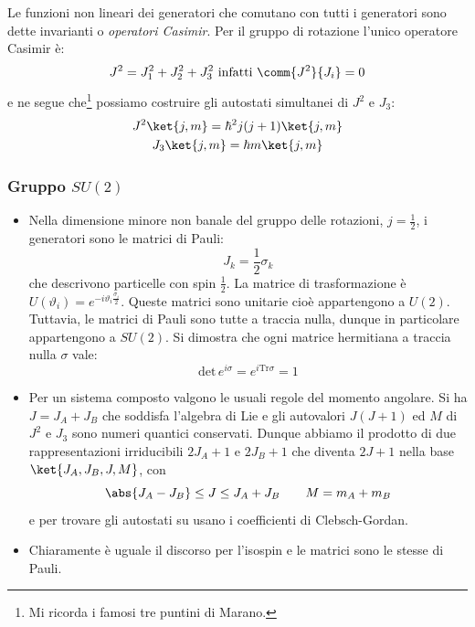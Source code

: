 \begin{itemize}
\begin{equation*}
    \end{equation*}
    Le funzioni non lineari dei generatori che comutano con tutti i generatori sono dette invarianti o \textit{operatori Casimir}. Per il gruppo di rotazione l'unico operatore Casimir è:
    \begin{equation*}
        J^2=J_1^2+J_2^2+J_3^2\text{ infatti }\comm{J^2}{J_i}=0
    \end{equation*}
    e ne segue che\footnote{Mi ricorda i famosi tre puntini di Marano.} possiamo costruire gli autostati simultanei di $J^2$ e $J_3$:
    \begin{gather*}
        J^2\ket{j,m}=\hbar^2j(j+1)\ket{j,m}\\
        J_3\ket{j,m}=\hbar m\ket{j,m}
    \end{gather*}
\end{itemize}
\subsubsection{Gruppo $SU(2)$}
\begin{itemize}
\item Nella dimensione minore non banale del gruppo delle rotazioni, $j=\frac12$, i generatori sono le matrici di Pauli:
\begin{equation*}
    J_k=\frac12\sigma_k
\end{equation*}
che descrivono particelle con spin $\frac12$.
La matrice di trasformazione è $U(\vartheta_i)=e^{-i\vartheta_i\frac{\sigma_i}2}$. Queste matrici sono unitarie cioè appartengono a $U(2)$. Tuttavia, le matrici di Pauli sono tutte a traccia nulla, dunque in particolare appartengono a $SU(2)$. Si dimostra che ogni matrice hermitiana a traccia nulla $\sigma$ vale:
\begin{equation*}
    \text{det}\,e^{i\sigma}=e^{i\text{Tr}\sigma}=1
\end{equation*}
\item Per un sistema composto valgono le usuali regole del momento angolare. Si ha $J=J_A+J_B$ che soddisfa l'algebra di Lie e gli autovalori $J(J+1)$ ed $M$ di $J^2$ e $J_3$ sono numeri quantici conservati. Dunque abbiamo il prodotto di due rappresentazioni irriducibili $2J_A+1$ e $2J_B+1$ che diventa $2J+1$ nella base $\ket{J_A,J_B,J,M}$, con 
\begin{equation*}
    \abs{J_A-J_B}\leq J\leq J_A+J_B\qquad M=m_A+m_B
\end{equation*}
e per trovare gli autostati su usano i coefficienti di Clebsch-Gordan.
\item Chiaramente è uguale il discorso per l'isospin e le matrici sono le stesse di Pauli. 
\end{itemize}
